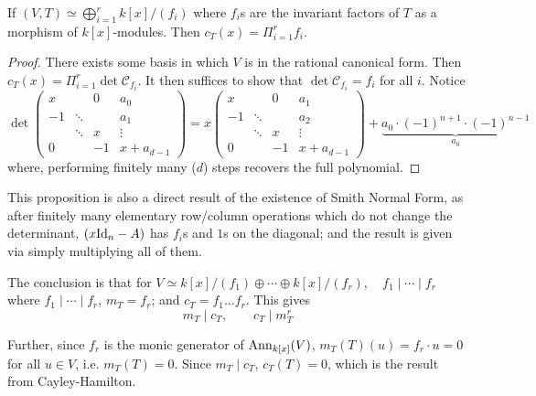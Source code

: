 \documentclass{article}
\begin{document}
\begin{proposition}
    If $(V, T) \simeq \bigoplus_{i=1}^r k[x]/(f_i)$ where $f_i$s are the invariant factors of $T$ as a morphism of $k[x]$-modules. Then $c_T(x) = \Pi_{i=1}^r f_i$. 
\end{proposition}

\begin{proof}
    There exists some basis in which $V$ is in the rational canonical form. Then $c_T(x) = \Pi_{i=1}^r \det \mathcal{C}_{f_i}$. It then suffices to show that $\det \mathcal{C}_{f_i} = f_i$ for all $i$. Notice
    \[
        \det \begin{pmatrix}
            x   &           & 0         & a_0    \\
            -1  & \ddots    &           & a_1    \\
                & \ddots    & x         & \vdots \\
            0   &           & -1        & x + a_{d-1}
        \end{pmatrix} = x\begin{pmatrix}
            x   &           & 0         & a_1    \\
            -1  & \ddots    &           & a_2    \\
                & \ddots    & x         & \vdots \\
            0   &           & -1        & x + a_{d-1}
        \end{pmatrix} + \underbrace{a_0 \cdot (-1)^{n+1} \cdot (-1)^{n-1}}_{a_0}
    \]
    where, performing finitely many ($d$) steps recovers the full polynomial. 
\end{proof}

\begin{remark}
    This proposition is also a direct result of the existence of Smith Normal Form, as after finitely many elementary row/column operations which do not change the determinant, $(x\mathrm{Id}_n - A)$ has $f_i$s and $1$s on the diagonal; and the result is given via simply multiplying all of them.
\end{remark}

The conclusion is that for $V \simeq k[x]/(f_1) \oplus \cdots \oplus k[x]/(f_r), \quad f_1 \mid \cdots \mid f_r$ where $f_1 \mid \cdots \mid f_r$, $m_T = f_r$; and $c_T = f_1 \ldots f_r$. This gives
\[
    m_T \mid c_T, \qquad c_T \mid m_T^{r}
\]

Further, since $f_r$ is the monic generator of $\mathrm{Ann}_{k[x]}(V)$, $m_T(T)(u) = f_r\cdot u = 0$ for all $u\in V$, i.e. $m_T(T) = 0$. Since $m_T \mid c_T$, $c_T(T) = 0$, which is the result from Cayley-Hamilton.
\end{document}
